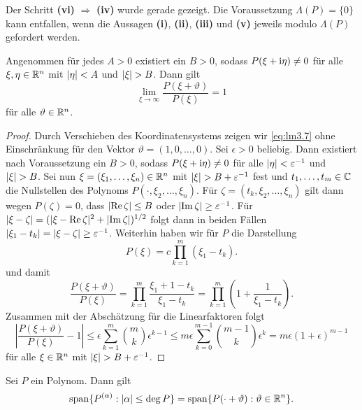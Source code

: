  Der Schritt {\bf (vi)} $\Rightarrow$ {\bf(iv)} wurde gerade gezeigt. Die Voraussetzung $\Lambda(P)=\{0\}$ kann entfallen, wenn die Aussagen {\bf (i)}, {\bf (ii)}, {\bf (iii)}
 und {\bf (v)} jeweils modulo $\Lambda(P)$ gefordert werden.


\begin{lem}
Angenommen für jedes $A>0$ existiert ein $B>0$, sodass $P(\xi+\mathrm i\eta)\neq 0$ für alle $\xi,\eta\in\mathbb R^n$ mit $\lvert\eta\rvert<A$ und $\lvert\xi\rvert>B$. Dann gilt
\begin{equation}
\lim_{\xi\to\infty}\dfrac{P(\xi+\vartheta)}{P(\xi)}=1 \label{eq:lm3.7}
\end{equation}
für alle $ \vartheta\in\mathbb R^n$.
\end{lem}
\begin{proof}
Durch Verschieben des Koordinatensystems zeigen wir \ref{eq:lm3.7} ohne Einschränkung für den Vektor $\vartheta=(1,0,\ldots,0)$. Sei $\epsilon > 0$ beliebig. Dann existiert nach Voraussetzung ein $B>0$, sodass $P(\xi+\mathrm i\eta)\neq 0$ für alle $\lvert\eta\rvert < \varepsilon^{-1}$ und $\lvert\xi\rvert>B$. Sei nun $\xi=(\xi_1,\ldots,\xi_n)\in\mathbb R^n$ mit $\lvert\xi\rvert>B+\varepsilon^{-1}$ fest und $t_1,\ldots,t_m\in \mathbb C$ die Nullstellen des Polynoms $P(\cdot,\xi_2,\ldots,\xi_n)$. Für $\zeta=(t_k,\xi_2,\ldots,\xi_n)$ gilt dann wegen $P(\zeta)=0$, dass $\lvert\operatorname{Re} \zeta\rvert \leq B$ oder $\lvert\operatorname{Im} \zeta\rvert \geq \varepsilon^{-1}$. Für $\lvert\xi-\zeta\rvert= (\lvert\xi-\operatorname{Re} \zeta\rvert^2+\lvert\operatorname{Im} \zeta\rvert)^{1/2}$ folgt dann in beiden Fällen $\lvert\xi_1-t_k\rvert=\lvert\xi-\zeta\rvert\geq \varepsilon^{-1}$. Weiterhin haben wir für $P$ die Darstellung
\begin{equation}
P(\xi)=c\prod_{k=1}^m (\xi_1-t_k).
\end{equation}
und damit
\begin{equation}
\dfrac{P(\xi+\vartheta)}{P(\xi)}=\prod_{k=1}^m \dfrac{\xi_1+1-t_k}{\xi_1-t_k}=\prod_{k=1}^m\left( 1+\dfrac{1}{\xi_1-t_k} \right).
\end{equation}
Zusammen mit der Abschätzung für die Linearfaktoren folgt
\begin{equation}
\left|\dfrac{P(\xi+\vartheta)}{P(\xi)}-1\right|\leq \epsilon\sum_{k=1}^m \binom{m}{k}\epsilon^{k-1} \leq m\epsilon  \sum_{k=0}^{m-1}\binom{m-1}{k}\epsilon^k = m\epsilon(1+\epsilon)^{m-1}
\end{equation}
für alle $\xi \in\mathbb R^n$ mit $\lvert\xi\rvert>B+\varepsilon^{-1}$.
\end{proof}
\begin{lem}
Sei $P$ ein Polynom. Dann gilt 
\begin{equation}
\operatorname{span}\{P^{(\alpha)}:\lvert\alpha\rvert\leq \deg P\}=\operatorname{span}\{P(\cdot+\vartheta):\vartheta\in\mathbb R^n\}.
\end{equation}
\end{lem}

